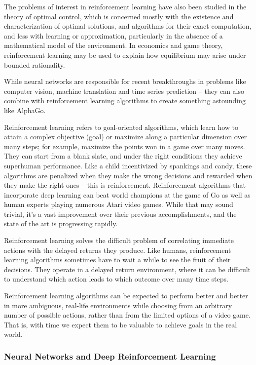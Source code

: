 The problems of interest in reinforcement learning have
also been studied in the theory of optimal control, which
is concerned mostly with the existence and characterization
of optimal solutions, and algorithms for their exact
computation, and less with learning or approximation,
particularly in the absence of a mathematical model of the
environment. In economics and game theory, reinforcement
learning may be used to explain how equilibrium may arise
under bounded rationality.\cite{wrl}

While neural networks are responsible for recent
breakthroughs in problems like computer vision, machine
translation and time series prediction – they can also
combine with reinforcement learning algorithms to create
something astounding like AlphaGo.\cite{alphago}

Reinforcement learning refers to goal-oriented algorithms,
which learn how to attain a complex objective (goal) or
maximize along a particular dimension over many steps; for
example, maximize the points won in a game over many moves.
They can start from a blank slate, and under the right
conditions they achieve superhuman performance. Like a
child incentivized by spankings and candy, these algorithms
are penalized when they make the wrong decisions and
rewarded when they make the right ones – this is
reinforcement. Reinforcement algorithms that incorporate
deep learning can beat world champions at the game of Go as
well as human experts playing numerous Atari video games.
While that may sound trivial, it’s a vast improvement over
their previous accomplishments, and the state of the art is
progressing rapidly.\cite{alphago}

Reinforcement learning solves the difficult problem of
correlating immediate actions with the delayed returns they
produce. Like humans, reinforcement learning algorithms
sometimes have to wait a while to see the fruit of their
decisions. They operate in a delayed return environment,
where it can be difficult to understand which action leads
to which outcome over many time steps.

Reinforcement learning algorithms can be expected to
perform better and better in more ambiguous, real-life
environments while choosing from an arbitrary number of
possible actions, rather than from the limited options of a
video game. That is, with time we expect them to be
valuable to achieve goals in the real world.\cite{aiw}

\subsubsection{Neural Networks and Deep Reinforcement
  Learning}
\label{ss_nn_nndrl}

